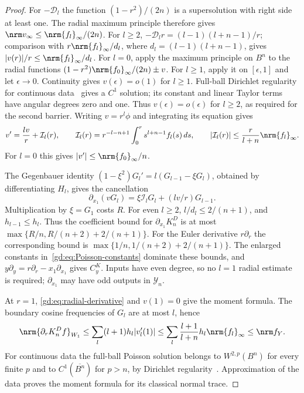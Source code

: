 \begin{proof}
For $-\mathcal D_l$ the function $(1-r^2)/(2n)$ is a supersolution
with right side at least one. The radial maximum principle therefore gives
$\nrm v_\infty\le\nrm{f_l}_\infty/(2n)$.
For $l\ge2$, $-\mathcal D_l r=(l-1)(l+n-1)/r$; comparison with
$r\nrm{f_l}_\infty/d_l$, where $d_l=(l-1)(l+n-1)$, gives
$|v(r)|/r\le\nrm{f_l}_\infty/d_l$.
For $l=0$, apply the maximum principle on $B^n$ to the radial functions
$(1-r^2)\nrm{f_0}_\infty/(2n)\pm v$. For $l\ge1$, apply it on
$[\epsilon,1]$ and let $\epsilon\to0$. Continuity gives $v(\epsilon)=o(1)$ for $l\ge1$.
Full-ball Dirichlet regularity for continuous data~\cite{GT01} gives a $C^1$
solution; its constant and linear Taylor terms have angular degrees
zero and one. Thus $v(\epsilon)=o(\epsilon)$ for $l\ge2$, as
required for the second barrier.
Writing $v=r^l\phi$ and integrating its equation gives
\begin{equation}\label{gd:eq:radial-derivative}
 v'=\frac{lv}{r}+\mathcal I_l(r),\qquad
 \mathcal I_l(r)=r^{-l-n+1}\int_0^r s^{l+n-1}f_l(s)\,ds,\qquad
 |\mathcal I_l(r)|\le\frac r{l+n}\nrm{f_l}_\infty .
\end{equation}
For $l=0$ this gives $|v'|\le\nrm{f_0}_\infty/n$.

The Gegenbauer identity
$(1-\xi^2)G_l'=l(G_{l-1}-\xi G_l)$, obtained by differentiating
$H_l$, gives the cancellation
\[
 \partial_{x_1}(vG_l)=\xi\mathcal I_lG_l+(lv/r)G_{l-1}.
\]
Multiplication by $\xi=G_1$ costs $R$.
For even $l\ge2$, $l/d_l\le2/(n+1)$, and $h_{l-1}\le h_l$.
Thus the coefficient bound for $\partial_{x_1}K_n^D$ is at most
$\max\{R/n,R/(n+2)+2/(n+1)\}$.
For the Euler derivative $r\partial_r$ the corresponding bound is
$\max\{1/n,1/(n+2)+2/(n+1)\}$.
The enlarged constants in~\eqref{gd:eq:Poisson-constants} dominate
these bounds, and $y\partial_y=r\partial_r-x_1\partial_{x_1}$
gives $C_y^K$. Inputs have even degree, so no $l=1$ radial estimate
is required; $\partial_{x_1}$ may have odd outputs in $\mathcal Y_n$.

At $r=1$, \eqref{gd:eq:radial-derivative} and $v(1)=0$
give the moment formula. The boundary cosine frequencies of $G_l$
are at most $l$, hence
\[
 \nrm{\partial_rK_n^Df}_{W_1}
 \le\sum_l(l+1)h_l|v_l'(1)|
 \le\sum_l\frac{l+1}{l+n}h_l\nrm{f_l}_\infty\le\nrm f_Y .
\]
For continuous data the full-ball Poisson solution belongs to
$W^{2,p}(B^n)$ for every finite $p$ and to $C^1(\overline{B^n})$
for $p>n$, by Dirichlet regularity~\cite{GT01}. Approximation of the data proves the moment formula
for its classical normal trace.
\end{proof}

